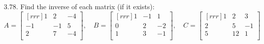 \documentclass[12pt]{article}
\begin{document}
\begin{enumerate}
\item [3.78.] Find the inverse of each matrix (if it exists):
	\[	A= \begin{bmatrix}[rrr] 1 & 2 & -4\\ -1 & -1 & 5\\ 2 & 7 & -4\\ \end{bmatrix}, \quad
		B= \begin{bmatrix}[rrr] 1 & -1 & 1\\ 0 & 2 & -2\\ 1 & 3 & -1\\ \end{bmatrix}, \quad
		C= \begin{bmatrix}[rrr] 1 & 2 & 3\\ 2 & 5 & -1\\ 5 & 12 & 1\\ \end{bmatrix} \]


\end{enumerate}
\end{document}
